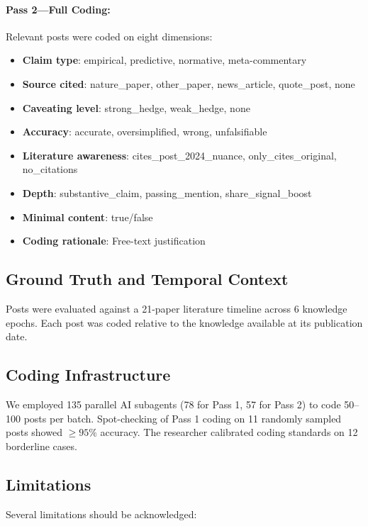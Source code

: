 \documentclass[11pt,preprint]{article}
\begin{document}
\paragraph{Pass 2---Full Coding:}
Relevant posts were coded on eight dimensions:
\begin{itemize}
  \item \textbf{Claim type}: empirical, predictive, normative, meta-commentary
  \item \textbf{Source cited}: nature\_paper, other\_paper, news\_article, quote\_post, none
  \item \textbf{Caveating level}: strong\_hedge, weak\_hedge, none
  \item \textbf{Accuracy}: accurate, oversimplified, wrong, unfalsifiable
  \item \textbf{Literature awareness}: cites\_post\_2024\_nuance, only\_cites\_original, no\_citations
  \item \textbf{Depth}: substantive\_claim, passing\_mention, share\_signal\_boost
  \item \textbf{Minimal content}: true/false
  \item \textbf{Coding rationale}: Free-text justification
\end{itemize}

\subsection{Ground Truth and Temporal Context}
Posts were evaluated against a 21-paper literature timeline across 6 knowledge epochs. Each post was coded relative to the knowledge available at its publication date.

\subsection{Coding Infrastructure}
We employed 135 parallel AI subagents (78 for Pass 1, 57 for Pass 2) to code 50--100 posts per batch. Spot-checking of Pass 1 coding on 11 randomly sampled posts showed $\geq 95\%$ accuracy. The researcher calibrated coding standards on 12 borderline cases.

\subsection{Limitations}
\label{subsec:limitations}

Several limitations should be acknowledged:
\end{document}
